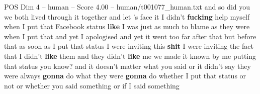 \begin{textsample}{POS Dim 4 – human – Score 4.00 – human/t001077\_human.txt}  \label{ex:f4_pos_009}
and so did you we both lived through it together and let 's face it I didn't \textbf{fucking} help myself when I put that Facebook status \textbf{like} I was just as much to blame as they were when I put that and yet I apologised and yet it went too far after that but before that as soon as I put that status I were inviting this \textbf{shit} I were inviting the fact that I didn't \textbf{like} them and they didn't \textbf{like} me we made it known by me putting that status you know? and it doesn't matter what you said or it didn't say they were always \textbf{gonna} do what they were \textbf{gonna} do whether I put that status or not or whether you said something or if I said something

\end{textsample}
